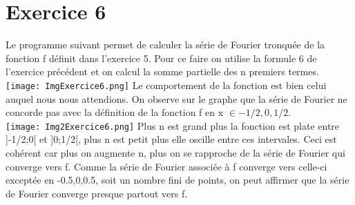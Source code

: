 \documentclass{article}
\begin{document}
\section{Exercice 6}
Le programme suivant permet de calculer la série de Fourier tronquée de la fonction f définit dans l'exercice 5. Pour ce faire on utilise la formule 6 de l'exercice précédent et on calcul la somme partielle des n premiers termes.
\noindent \texttt{[image: ImgExercice6.png]}
Le comportement de la fonction est bien celui auquel nous nous attendions. On observe sur le graphe que la série de Fourier ne concorde pas avec la définition de la fonction f en x $\in{-1/2,0,1/2}$.\\
\noindent \texttt{[image: Img2Exercice6.png]}
Plus n est grand plus la fonction est plate entre ]-1/2;0$[$ et ]0;1/2$[$, plus n est petit plus elle oscille entre ces intervales. Ceci est cohérent car plus on augmente n, plus on se rapproche de la série de Fourier qui converge vers f.
Comme la série de Fourier associée à f converge vers celle-ci exceptée en {-0.5,0,0.5}, soit un nombre fini de points, on peut affirmer que la série de Fourier converge presque partout vers f.
\end{document}
